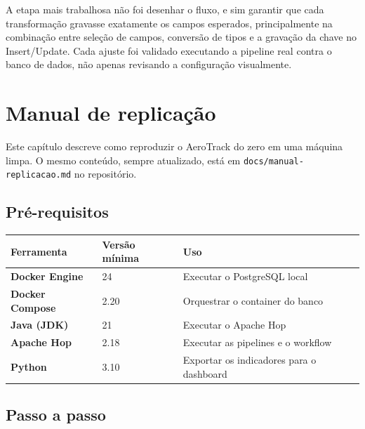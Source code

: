 \documentclass[12pt,a4paper,openany]{report}
\begin{document}
A etapa mais trabalhosa não foi desenhar o fluxo, e sim garantir que cada
transformação gravasse exatamente os campos esperados, principalmente na
combinação entre seleção de campos, conversão de tipos e a gravação da chave
no Insert/Update. Cada ajuste foi validado executando a pipeline real contra
o banco de dados, não apenas revisando a configuração visualmente.

\chapter{Manual de replicação}

Este capítulo descreve como reproduzir o AeroTrack do zero em uma máquina
limpa. O mesmo conteúdo, sempre atualizado, está em
\texttt{docs/manual-replicacao.md} no repositório.

\section{Pré-requisitos}

\small
\begin{longtable}{>{\bfseries}p{} p{} p{}}
\toprule
Ferramenta & Versão mínima & Uso \\
\midrule
\endhead
Docker Engine & 24 & Executar o PostgreSQL local \\
Docker Compose & 2.20 & Orquestrar o container do banco \\
Java (JDK) & 21 & Executar o Apache Hop \\
Apache Hop & 2.18 & Executar as pipelines e o workflow \\
Python & 3.10 & Exportar os indicadores para o dashboard \\
\bottomrule
\end{longtable}
\normalsize

\section{Passo a passo}
\end{document}
